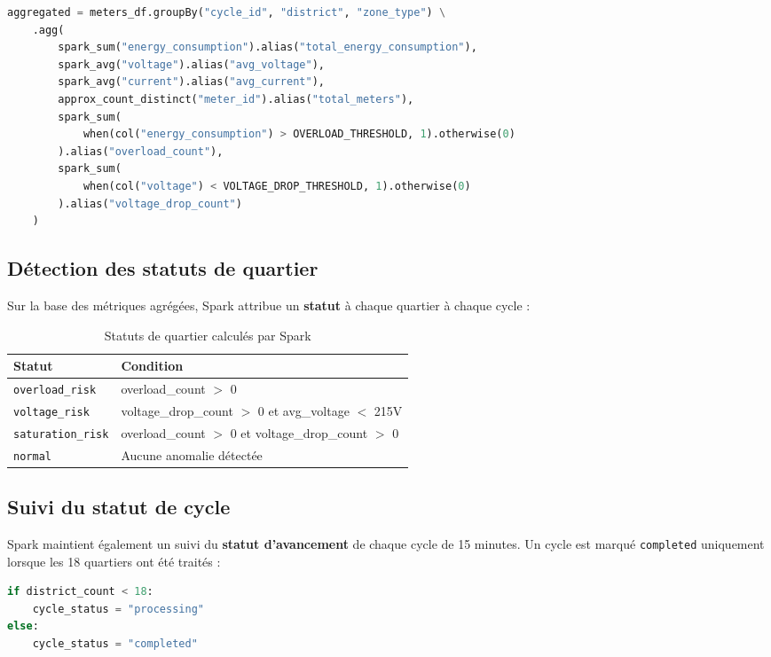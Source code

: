\documentclass[1pt,a4paper]{report}
\begin{document}
\begin{lstlisting}[language=python, caption={Agrégation Spark par cycle et quartier}]
aggregated = meters_df.groupBy("cycle_id", "district", "zone_type") \
    .agg(
        spark_sum("energy_consumption").alias("total_energy_consumption"),
        spark_avg("voltage").alias("avg_voltage"),
        spark_avg("current").alias("avg_current"),
        approx_count_distinct("meter_id").alias("total_meters"),
        spark_sum(
            when(col("energy_consumption") > OVERLOAD_THRESHOLD, 1).otherwise(0)
        ).alias("overload_count"),
        spark_sum(
            when(col("voltage") < VOLTAGE_DROP_THRESHOLD, 1).otherwise(0)
        ).alias("voltage_drop_count")
    )
\end{lstlisting}

\subsection{Détection des statuts de quartier}

Sur la base des métriques agrégées, Spark attribue un \textbf{statut} à chaque quartier
à chaque cycle :

\begin{table}[H]
\centering
\begin{tabular}{|l|l|}
\hline
\textbf{Statut} & \textbf{Condition} \\
\hline
\texttt{overload\_risk} & overload\_count $>$ 0 \\
\hline
\texttt{voltage\_risk} & voltage\_drop\_count $>$ 0 et avg\_voltage $<$ 215V \\
\hline
\texttt{saturation\_risk} & overload\_count $>$ 0 et voltage\_drop\_count $>$ 0 \\
\hline
\texttt{normal} & Aucune anomalie détectée \\
\hline
\end{tabular}
\caption{Statuts de quartier calculés par Spark}
\label{tab:district_status}
\end{table}

\subsection{Suivi du statut de cycle}

Spark maintient également un suivi du \textbf{statut d'avancement} de chaque cycle
de 15 minutes. Un cycle est marqué \texttt{completed} uniquement lorsque les 18 quartiers
ont été traités :

\begin{lstlisting}[language=python, caption={Mise à jour du statut de cycle}]
if district_count < 18:
    cycle_status = "processing"
else:
    cycle_status = "completed"
\end{lstlisting}
\end{document}
